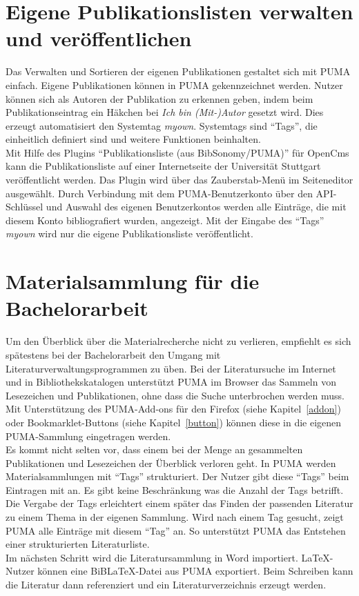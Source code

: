 \section{Eigene Publikationslisten verwalten und veröffentlichen}
Das Verwalten und Sortieren der eigenen Publikationen gestaltet sich mit PUMA einfach. Eigene  Publikationen können in PUMA gekennzeichnet werden. Nutzer können sich als Autoren der Publikation zu erkennen geben, indem beim Publikationseintrag ein Häkchen bei \textit{Ich bin (Mit-)Autor} gesetzt wird. Dies erzeugt automatisiert den Systemtag \textit{myown}. Systemtags sind \enquote{Tags}, die einheitlich definiert sind und weitere Funktionen beinhalten.\\
Mit Hilfe des Plugins \enquote{Publikationsliste (aus BibSonomy/PUMA)} für OpenCms kann die Publikationsliste auf einer Internetseite der Universität Stuttgart veröffentlicht werden. Das Plugin wird über das Zauberstab-Menü im Seiteneditor ausgewählt. Durch Verbindung mit dem PUMA-Benutzerkonto über den API-Schlüssel und Auswahl des eigenen Benutzerkontos werden alle Einträge, die mit diesem Konto bibliografiert wurden, angezeigt. Mit der Eingabe des \enquote{Tags} \textit{myown} wird nur die eigene Publikationsliste veröffentlicht.



\section{Materialsammlung für die Bachelorarbeit}
Um den Überblick über die Materialrecherche nicht zu verlieren, empfiehlt es sich spätestens bei der Bachelorarbeit den Umgang mit Literaturverwaltungsprogrammen zu üben. Bei der Literatursuche im Internet und in Bibliothekskatalogen unterstützt PUMA im Browser das Sammeln von Lesezeichen und Publikationen, ohne dass die Suche unterbrochen werden muss. Mit Unterstützung des PUMA-Add-ons für den Firefox (siehe Kapitel~\ref{addon}) oder Bookmarklet-Buttons (siehe Kapitel~\ref{button}) können diese in die eigenen PUMA-Sammlung eingetragen werden.\\
Es kommt nicht selten vor, dass einem bei der Menge an gesammelten Publikationen und Lesezeichen der Überblick verloren geht. In PUMA werden Materialsammlungen mit \enquote{Tags} strukturiert. Der Nutzer gibt diese \enquote{Tags} beim Eintragen mit an. Es gibt keine Beschränkung was die Anzahl der Tags betrifft. Die Vergabe der Tags erleichtert einem später das Finden der passenden Literatur zu einem Thema in der eigenen Sammlung. Wird nach einem Tag gesucht, zeigt PUMA alle Einträge mit diesem \enquote{Tag} an. So unterstützt PUMA das Entstehen einer strukturierten Literaturliste.\\
Im nächsten Schritt wird die Literatursammlung in Word importiert. LaTeX-Nutzer können eine BiBLaTeX-Datei aus PUMA exportiert. Beim Schreiben kann die Literatur dann referenziert und ein Literaturverzeichnis erzeugt werden.
